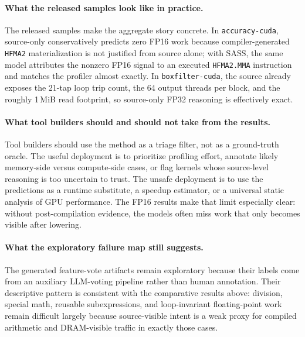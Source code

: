

\paragraph{What the released samples look like in practice.}
The released samples make the aggregate story concrete.
In \texttt{accuracy-cuda}, source-only \opus conservatively predicts zero FP16 work because compiler-generated \texttt{HFMA2} materialization is not justified from source alone; with SASS, the same model attributes the nonzero FP16 signal to an executed \texttt{HFMA2.MMA} instruction and matches the profiler almost exactly.
In \texttt{boxfilter-cuda}, the source already exposes the 21-tap loop trip count, the 64 output threads per block, and the roughly 1\,MiB read footprint, so source-only FP32 reasoning is effectively exact.

\paragraph{What tool builders should and should not take from the results.}
Tool builders should use the method as a triage filter, not as a ground-truth oracle.
The useful deployment is to prioritize profiling effort, annotate likely memory-side versus compute-side cases, or flag kernels whose source-level reasoning is too uncertain to trust.
The unsafe deployment is to use the predictions as a runtime substitute, a speedup estimator, or a universal static analysis of GPU performance.
The FP16 results make that limit especially clear: without post-compilation evidence, the models often miss work that only becomes visible after lowering.

\paragraph{What the exploratory failure map still suggests.}
The generated feature-vote artifacts remain exploratory because their labels come from an auxiliary LLM-voting pipeline rather than human annotation.
Their descriptive pattern is consistent with the comparative results above:
division, special math, reusable subexpressions, and loop-invariant floating-point work remain difficult largely because source-visible intent is a weak proxy for compiled arithmetic and DRAM-visible traffic in exactly those cases.

